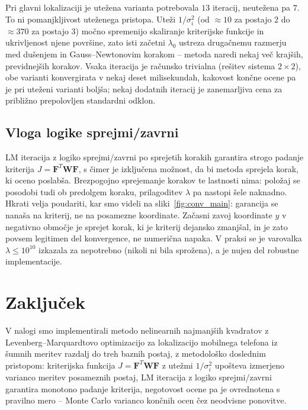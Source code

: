 \documentclass[a4paper,11pt]{article}
\begin{document}
Pri glavni lokalizaciji je utežena varianta potrebovala $13$ iteracij, neutežena pa $7$. To ni pomanjkljivost uteženega pristopa. Uteži $1/\sigma_i^2$ (od $\approx 10$ za postajo 2 do $\approx 370$ za postajo 3) močno spremenijo skaliranje kriterijske funkcije in ukrivljenost njene površine, zato isti začetni $\lambda_0$ ustreza drugačnemu razmerju med dušenjem in Gauss--Newtonovim korakom -- metoda naredi nekaj več krajših, previdnejših korakov. Vsaka iteracija je računsko trivialna (rešitev sistema $2\times 2$), obe varianti konvergirata v nekaj deset milisekundah, kakovost končne ocene pa je pri uteženi varianti boljša; nekaj dodatnih iteracij je zanemarljiva cena za približno prepolovljen standardni odklon.

\subsection{Vloga logike sprejmi/zavrni}
LM iteracija z logiko sprejmi/zavrni po sprejetih korakih garantira strogo padanje kriterija $J = \mathbf{F}^T\mathbf{W}\mathbf{F}$, s čimer je izključena možnost, da bi metoda sprejela korak, ki oceno poslabša. Brezpogojno sprejemanje korakov te lastnosti nima: položaj se posodobi tudi ob predolgem koraku, prilagoditev $\lambda$ pa nastopi šele naknadno. Hkrati velja poudariti, kar smo videli na sliki~\ref{fig:conv_main}: garancija se nanaša na kriterij, ne na posamezne koordinate. Začasni zavoj koordinate $y$ v negativno območje je sprejet korak, ki je kriterij dejansko zmanjšal, in je zato povsem legitimen del konvergence, ne numerična napaka. V praksi se je varovalka $\lambda \le 10^{10}$ izkazala za nepotrebno (nikoli ni bila sprožena), a je nujen del robustne implementacije.

\section{Zaključek}
V nalogi smo implementirali metodo nelinearnih najmanjših kvadratov z Levenberg--Marquardtovo optimizacijo za lokalizacijo mobilnega telefona iz šumnih meritev razdalj do treh baznih postaj, z metodološko doslednim pristopom: kriterijska funkcija $J=\mathbf{F}^T\mathbf{W}\mathbf{F}$ z utežmi $1/\sigma_i^2$ upošteva izmerjeno varianco meritev posameznih postaj, LM iteracija z logiko sprejmi/zavrni garantira monotono padanje kriterija, negotovost ocene pa je ovrednotena s pravilno mero -- Monte Carlo varianco končnih ocen čez neodvisne ponovitve.
\end{document}
